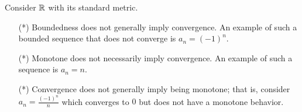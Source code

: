 \documentclass[a4paper]{article}
\begin{document}
\begin{remark}
    Consider \( \mathbb{R}  \) with its standard metric.
    \begin{enumerate}
        \item[(*)] Boundedness does not generally imply convergence. An example of such a bounded sequence that does not converge is \( {a}_{n} = (-1)^{n} \).
        \item[(*)] Monotone does not necessarily imply convergence. An example of such a sequence is \( {a}_{n} = n  \).
        \item[(*)] Convergence does not generally imply being monotone; that is, consider \( {a}_{n} = \frac{ (-1)^{n} }{ n }  \) which converges to \( 0  \) but does not have a monotone behavior.
    \end{enumerate}
\end{remark}
\end{document}
